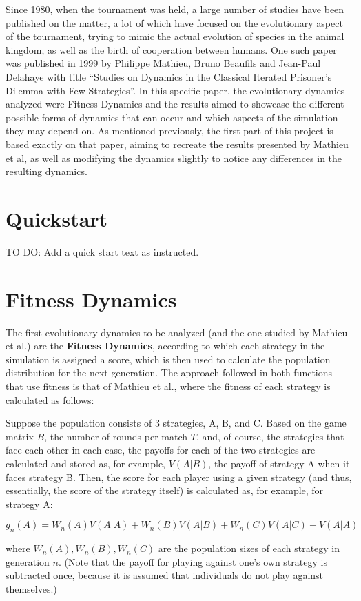 \documentclass[12pt]{article}
\begin{document}
Since 1980, when the tournament was held, a large number of studies have been published on the matter, a lot of which have focused on the evolutionary aspect of the tournament, trying to mimic the actual evolution of species in the animal kingdom, as well as the birth of cooperation between humans. One such paper was published in 1999 by Philippe Mathieu, Bruno Beaufils and Jean-Paul Delahaye with title ``Studies on Dynamics in the Classical Iterated Prisoner's Dilemma with Few Strategies''. In this specific paper, the evolutionary dynamics analyzed were Fitness Dynamics and the results aimed to showcase the different possible forms of dynamics that can occur and which aspects of the simulation they may depend on. As mentioned previously, the first part of this project is based exactly on that paper, aiming to recreate the results presented by Mathieu et al, as well as modifying the dynamics slightly to notice any differences in the resulting dynamics.
\clearpage
\section{Quickstart}

TO DO: Add a quick start text as instructed.
\section{Fitness Dynamics}

The first evolutionary dynamics to be analyzed (and the one studied by Mathieu et al.) are the \textbf{Fitness Dynamics}, according to which each strategy in the simulation is assigned a score, which is then used to calculate the population distribution for the next generation. The approach followed in both functions that use fitness is that of Mathieu et al., where the fitness of each strategy is calculated as follows:

Suppose the population consists of 3 strategies, A, B, and C. Based on the game matrix $B$, the number of rounds per match $T$, and, of course, the strategies that face each other in each case, the payoffs for each of the two strategies are calculated and stored as, for example, $V(A|B)$, the payoff of strategy A when it faces strategy B. Then, the score for each player using a given strategy (and thus, essentially, the score of the strategy itself) is calculated as, for example, for strategy A:

\[
g_n(A) = W_n(A)V(A|A) + W_n(B)V(A|B) + W_n(C)V(A|C) - V(A|A)
\]

where $W_n(A), W_n(B), W_n(C)$ are the population sizes of each strategy in generation $n$. (Note that the payoff for playing against one’s own strategy is subtracted once, because it is assumed that individuals do not play against themselves.)
\end{document}
